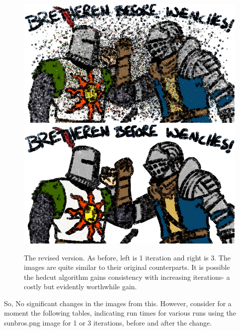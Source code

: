 \documentclass[11pt]{article}
\begin{document}
\begin{figure}[H]
\includegraphics[scale=0.5]{sunbros-lessrescale-itr1-100000.png}
\includegraphics[scale=0.5]{sunbros-lessrescale-itr3-100000.png}
\caption{The revised version. As before, left is 1 iteration and right is 3. The images are quite similar to their original counterparts. It is possible the hedcut algorithm gains consistency with increasing iterations- a costly but evidently worthwhile gain.}
\end{figure}

So, No significant changes in the images from this. However, consider for a moment the following tables, indicating run times for various runs using the sunbros.png image for 1 or 3 iterations, before and after the change.
\end{document}
